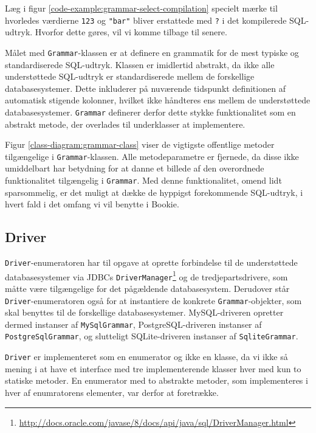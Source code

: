 Læg i figur \ref{code-example:grammar-select-compilation} specielt mærke til hvorledes værdierne \texttt{123} og \texttt{"bar"} bliver erstattede med \texttt{?} i det kompilerede SQL-udtryk. Hvorfor dette gøres, vil vi komme tilbage til senere.

Målet med \texttt{Grammar}-klassen er at definere en grammatik for de mest typiske og standardiserede SQL-udtryk. Klassen er imidlertid abstrakt, da ikke alle understøttede SQL-udtryk er standardiserede mellem de forskellige databasesystemer. Dette inkluderer på nuværende tidspunkt definitionen af automatisk stigende kolonner, hvilket ikke håndteres ens mellem de understøttede databasesystemer. \texttt{Grammar} definerer derfor dette stykke funktionalitet som en abstrakt metode, der overlades til underklasser at implementere.

Figur \ref{class-diagram:grammar-class} viser de vigtigste offentlige metoder tilgængelige i \texttt{Grammar}-klassen. Alle metodeparametre er fjernede, da disse ikke umiddelbart har betydning for at danne et billede af den overordnede funktionalitet tilgængelig i \texttt{Grammar}. Med denne funktionalitet, omend lidt sparsommelig, er det muligt at dække de hyppigst forekommende SQL-udtryk, i hvert fald i det omfang vi vil benytte i Bookie.

\subsection{Driver}

\texttt{Driver}-enumeratoren har til opgave at oprette forbindelse til de understøttede databasesystemer via JDBCs \texttt{Driver\-Manager}\footnote{\url{http://docs.oracle.com/javase/8/docs/api/java/sql/DriverManager.html}} og de tredjepartsdrivere, som måtte være tilgængelige for det pågældende databasesystem. Derudover står \texttt{Driver}-enumeratoren også for at instantiere de konkrete \texttt{Grammar}-objekter, som skal benyttes til de forskellige databasesystemer. MySQL-driveren opretter dermed instanser af \texttt{MySql\-Grammar}, PostgreSQL-driveren instanser af \texttt{PostgreSql\-Grammar}, og slutteligt SQLite-driveren instanser af \texttt{Sqlite\-Grammar}.

\texttt{Driver} er implementeret som en enumerator og ikke en klasse, da vi ikke så mening i at have et interface med tre implementerende klasser hver med kun to statiske metoder. En enumerator med to abstrakte metoder, som implementeres i hver af enumratorens elementer, var derfor at foretrække.

